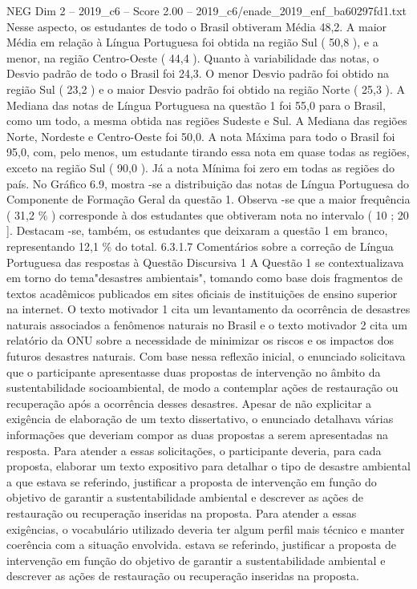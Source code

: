 \begin{textsample}{NEG Dim 2 – 2019\_c6 – Score 2.00 – 2019\_c6/enade\_2019\_enf\_ba60297fd1.txt}
Nesse aspecto, os estudantes de todo o Brasil obtiveram Média 48,2.
A maior Média em relação à Língua Portuguesa foi obtida na região Sul ( 50,8 ), e a menor, na região Centro-Oeste ( 44,4 ).
Quanto à variabilidade das notas, o Desvio padrão de todo o Brasil foi 24,3.
O menor Desvio padrão foi obtido na região Sul ( 23,2 ) e o maior Desvio padrão foi obtido na região Norte ( 25,3 ).
A Mediana das notas de Língua Portuguesa na questão 1 foi 55,0 para o Brasil, como um todo, a mesma obtida nas regiões Sudeste e Sul.
A Mediana das regiões Norte, Nordeste e Centro-Oeste foi 50,0.
A nota Máxima para todo o Brasil foi 95,0, com, pelo menos, um estudante tirando essa nota em quase todas as regiões, exceto na região Sul ( 90,0 ).
Já a nota Mínima foi zero em todas as regiões do país.
No Gráfico 6.9, mostra -se a distribuição das notas de Língua Portuguesa do Componente de Formação Geral da questão 1.
Observa -se que a maior frequência ( 31,2 \% ) corresponde à dos estudantes que obtiveram nota no intervalo ( 10 ; 20 ].
Destacam -se, também, os estudantes que deixaram a questão 1 em branco, representando 12,1 \% do total. 6.3.1.7 Comentários sobre a correção de Língua Portuguesa das respostas à Questão Discursiva 1 A Questão 1 se contextualizava em torno do tema"desastres ambientais", tomando como base dois fragmentos de textos acadêmicos publicados em sites oficiais de instituições de ensino superior na internet.
O texto motivador 1 cita um levantamento da ocorrência de desastres naturais associados a fenômenos naturais no Brasil e o texto motivador 2 cita um relatório da ONU sobre a necessidade de minimizar os riscos e os impactos dos futuros desastres naturais.
Com base nessa reflexão inicial, o enunciado solicitava que o participante apresentasse duas propostas de intervenção no âmbito da sustentabilidade socioambiental, de modo a contemplar ações de restauração ou recuperação após a ocorrência desses desastres.
Apesar de não explicitar a exigência de elaboração de um texto dissertativo, o enunciado detalhava várias informações que deveriam compor as duas propostas a serem apresentadas na resposta.
Para atender a essas solicitações, o participante deveria, para cada proposta, elaborar um texto expositivo para detalhar o tipo de desastre ambiental a que estava se referindo, justificar a proposta de intervenção em função do objetivo de garantir a sustentabilidade ambiental e descrever as ações de restauração ou recuperação inseridas na proposta.
Para atender a essas exigências, o vocabulário utilizado deveria ter algum perfil mais técnico e manter coerência com a situação envolvida. estava se referindo, justificar a proposta de intervenção em função do objetivo de garantir a sustentabilidade ambiental e descrever as ações de restauração ou recuperação inseridas na proposta.

\end{textsample}
